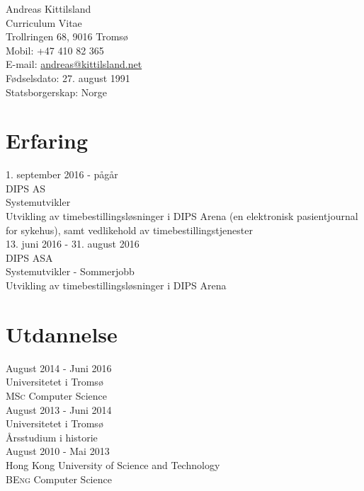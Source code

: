 \documentclass[norsk, 10pt, a4paper]{article}
\newcommand{\interval}[2]{\small{#1 - #2}}
\newcommand{\institution}[1]{\normalsize{#1}}
\newcommand{\position}[1]{\large{#1}}
\newcommand{\course}[2]{\position{\textsc{#1} #2}}
\newcommand{\desc}[1]{\normalsize{#1}}
\begin{document}
{\LARGE Andreas Kittilsland}\\
{\large Curriculum Vitae}\\[14pt]
Trollringen 68, 9016 Tromsø\\
Mobil: +47 410 82 365\\
E-mail: \href{mailto:andreas@kittilsland.net}{andreas@kittilsland.net}\\
Fødselsdato: 27. august 1991\\
Statsborgerskap: Norge

\section*{Erfaring}

\interval{1. september 2016}{pågår}\\
\institution{DIPS AS}\\
\position{Systemutvikler}\\
\desc{Utvikling av timebestillingsløsninger i DIPS Arena (en elektronisk pasientjournal for sykehus), samt vedlikehold av timebestillingstjenester}\\

\interval{13. juni 2016}{31. august 2016}\\
\institution{DIPS ASA}\\
\position{Systemutvikler - Sommerjobb}\\
\desc{Utvikling av timebestillingsløsninger i DIPS Arena}\\

\section*{Utdannelse}

\interval{August 2014}{Juni 2016}\\
\institution{Universitetet i Tromsø}\\
\course{MSc}{Computer Science}\\

\interval{August 2013}{Juni 2014}\\
\institution{Universitetet i Tromsø}\\
\course{}{Årsstudium i historie}\\

\interval{August 2010}{Mai 2013}\\
\institution{Hong Kong University of Science and Technology}\\
\course{BEng}{Computer Science}\\
\end{document}
